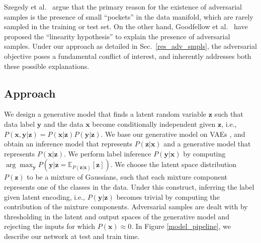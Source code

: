 \documentclass[letterpaper]{article} %
\begin{document}
Szegedy et al.~ argue that the primary reason for the existence of adversarial samples is the presence of small ``pockets'' in the data manifold, which are rarely sampled in the training or test set. On the other hand, Goodfellow et al.~ have proposed the ``linearity hypothesis'' to explain the presence of adversarial samples. Under our approach as detailed in Sec.~\ref{res_adv_smpls}, the adversarial objective poses a fundamental conflict of interest, and inherently addresses both these possible explanations.

\subsection{Approach} %
We design a generative model that finds a latent random variable $\mathbf{z}$ such that data label $\mathbf{y}$ and the data $\mathbf{x}$ become conditionally independent given $\mathbf{z}$, i.e., $P(\mathbf{x}, \mathbf{y} | \mathbf{z}) = P(\mathbf{x}|\mathbf{z})P(\mathbf{y}|\mathbf{z})$. We base our generative model on VAEs , and obtain an inference model that represents $P(\mathbf{z}|\mathbf{x})$ and a generative model that represents $P(\mathbf{x}|\mathbf{z})$. We perform label inference $P(\mathbf{y}|\mathbf{x})$ by computing $\arg\max_{\mathbf{y}} P(\mathbf{y}|\mathbf{z}= \mathbb{E}_{P(\mathbf{z}|\mathbf{x})}[\mathbf{z}])$. We choose the latent space distribution $P(\mathbf{z})$ to be a  mixture of Gaussians, such that each mixture component represents one of the classes in the data. Under this construct, inferring the label given latent encoding, i.e., $P(\mathbf{y}|\mathbf{z})$ becomes trivial by computing the contribution of the mixture components. Adversarial samples are dealt with by thresholding in the latent and output spaces of the generative model and rejecting the inputs for which $P(\mathbf{x}) \approx 0$. In Figure \ref{model_pipeline}, we describe our network at test and train time.
\end{document}
